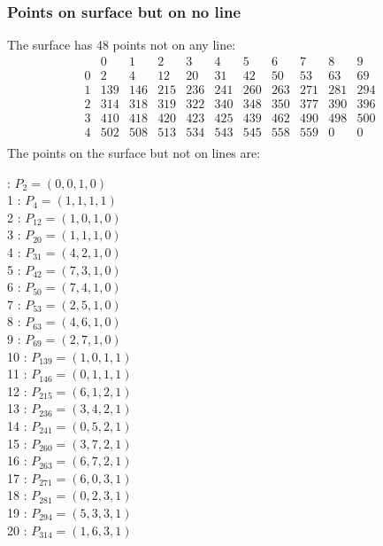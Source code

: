 \documentclass{article}
\begin{document}
{\subsubsection*{Points on surface but on no line}
The surface has 48 points not on any line:\\
$$
\begin{array}{r|*{10}{r}}
 & 0 & 1 & 2 & 3 & 4 & 5 & 6 & 7 & 8 & 9\\
\hline
0 & 2 & 4 & 12 & 20 & 31 & 42 & 50 & 53 & 63 & 69\\
1 & 139 & 146 & 215 & 236 & 241 & 260 & 263 & 271 & 281 & 294\\
2 & 314 & 318 & 319 & 322 & 340 & 348 & 350 & 377 & 390 & 396\\
3 & 410 & 418 & 420 & 423 & 425 & 439 & 462 & 490 & 498 & 500\\
4 & 502 & 508 & 513 & 534 & 543 & 545 & 558 & 559 & 0 & 0\\
\end{array}
$$
The points on the surface but not on lines are:\\
\begin{multicols}{2}
 : $P_{2}=( 0, 0, 1, 0 )$\\
1 : $P_{4}=( 1, 1, 1, 1 )$\\
2 : $P_{12}=( 1, 0, 1, 0 )$\\
3 : $P_{20}=( 1, 1, 1, 0 )$\\
4 : $P_{31}=( 4, 2, 1, 0 )$\\
5 : $P_{42}=( 7, 3, 1, 0 )$\\
6 : $P_{50}=( 7, 4, 1, 0 )$\\
7 : $P_{53}=( 2, 5, 1, 0 )$\\
8 : $P_{63}=( 4, 6, 1, 0 )$\\
9 : $P_{69}=( 2, 7, 1, 0 )$\\
10 : $P_{139}=( 1, 0, 1, 1 )$\\
11 : $P_{146}=( 0, 1, 1, 1 )$\\
12 : $P_{215}=( 6, 1, 2, 1 )$\\
13 : $P_{236}=( 3, 4, 2, 1 )$\\
14 : $P_{241}=( 0, 5, 2, 1 )$\\
15 : $P_{260}=( 3, 7, 2, 1 )$\\
16 : $P_{263}=( 6, 7, 2, 1 )$\\
17 : $P_{271}=( 6, 0, 3, 1 )$\\
18 : $P_{281}=( 0, 2, 3, 1 )$\\
19 : $P_{294}=( 5, 3, 3, 1 )$\\
20 : $P_{314}=( 1, 6, 3, 1 )$\\

\end{multicols}}
\end{document}
